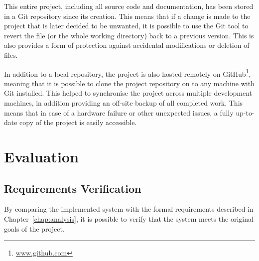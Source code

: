 \documentclass[11pt,a4paper]{report}
\begin{document}
This entire project, including all source code and documentation, has been stored in a Git repository since its creation. This means that if a change is made to the project that is later decided to be unwanted, it is possible to use the Git tool to revert the file (or the whole working directory) back to a previous version. This is also provides a form of protection against accidental modifications or deletion of files.

In addition to a local repository, the project is also hosted remotely on GitHub\footnote{\url{www.github.com}}, meaning that it is possible to clone the project repository on to any machine with Git installed. This helped to synchronise the project across multiple development machines, in addition providing an off-site backup of all completed work. This means that in case of a hardware failure or other unexpected issues, a fully up-to-date copy of the project is easily accessible.

\pagebreak

\chapter{Evaluation}
\label{chap:evaluation}

\section{Requirements Verification}
By comparing the implemented system with the formal requirements described in Chapter~\ref{chap:analysis}, it is possible to verify that the system meets the original goals of the project.
\end{document}

